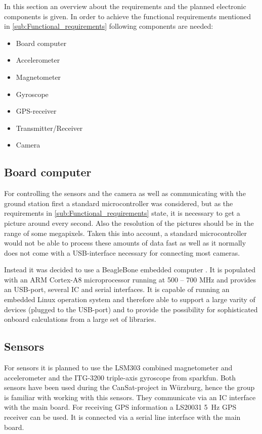 \documentclass[fontsize=11pt,paper=a4,]{scrartcl}
\begin{document}
In this section an overview about the requirements and the planned electronic components is given. In order to achieve the functional requirements mentioned in \ref{sub:Functional_requirements} following components are needed:

\begin{itemize}
 \item Board computer
 \item Accelerometer
 \item Magnetometer
 \item Gyroscope
 \item GPS-receiver
 \item Transmitter/Receiver
 \item Camera
\end{itemize}


\subsection*{Board computer}

For controlling the sensors and the camera as well as communicating with the ground station first a standard microcontroller was considered, but as the requirements in \ref{sub:Functional_requirements} state, it is necessary to get a picture around every second. Also the resolution of the pictures should be in the range of some megapixels. Taken this into account, a standard microcontroller would not be able to process these amounts of data fast as well as it normally does not come with a USB-interface necessary for connecting most cameras.

Instead it was decided to use a BeagleBone embedded computer \cite{BeagleBone:SRM}. It is populated with an ARM Cortex-A8 microprocessor running at 500 -- 700 MHz and provides an USB-port, several I{\texttwosuperior}C and serial interfaces. It is capable of running an embedded Linux operation system and therefore able to support a large varity of devices (plugged to the USB-port) and to provide the possibility for sophisticated onboard calculations from a large set of libraries.

\subsection*{Sensors}

For sensors it is planned to use the LSM303 \cite{LSM303:datasheet} combined magnetometer and accelerometer and the ITG-3200 triple-axis gyroscope \cite{ITG-3200:datasheet} from sparkfun. Both sensors have been used during the CanSat-project in Würzburg, hence the group is familiar with working with this sensors. They communicate via an I{\texttwosuperior}C interface with the main board. For receiving GPS information a LS20031 5~Hz GPS receiver \cite{LS20031:datasheet} can be used. It is connected via a serial line interface with the main board.
\end{document}

